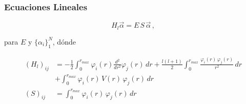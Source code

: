 \documentclass{beamer}
\begin{document}
\begin{frame}
    \frametitle{Ecuaciones Lineales}
    \begin{displaymath}\label{ec_auval}
    H_l \vec{\alpha} = E\,S\,\vec{\alpha}\,,
    \end{displaymath}

    \noindent 
    para $E$ y $\lbrace\alpha_i\rbrace_1^N$, d\'onde

    \begin{align}\label{elemento_matriz}
    (H_l)_{ij} &= -\frac{1}{2} \int_0^{r_{max}} \varphi_i(r) \frac{d^2}{dr^2}\varphi_j(r) \,dr \nonumber
               + \frac{l(l+1)}{2}\int_0^{r_{max}} \frac{\varphi_i(r) \,\varphi_j(r)}{r^2} \,dr \\
               & + \int_0^{r_{max}} \varphi_i(r)\,V(r)\,\varphi_j(r)\, dr \\
    (S)_{ij} &= \int_0^{r_{max}} \varphi_i(r)\,\varphi_j(r)\,dr \label{solapamiento}
    \end{align}
\end{frame}
\end{document}

